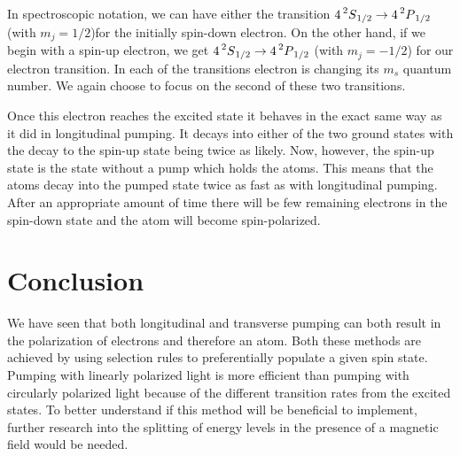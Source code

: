 \documentclass[12pt]{article}
\begin{document}
	In spectroscopic notation, we can have either the transition
	$4\prescript{2}{}S_{1/2} \rightarrow 4\prescript{2}{}P_{1/2}$
	(with $m_j=1/2$)for the initially spin-down electron.
	On the other hand, if we begin with a spin-up electron, we get 
	$4\prescript{2}{}S_{1/2} \rightarrow 4\prescript{2}{}P_{1/2}$
	(with $m_j=-1/2$)
	for our electron transition. In each of the transitions
	electron is changing its $m_s$ quantum number.
	We again choose to focus on the second of these two 
	transitions. 

	Once this electron reaches the excited state it behaves in
	the exact same way as it did in longitudinal pumping. It
	decays into either of the two ground states with the decay
	to the spin-up state being twice as likely. Now, however,
	the spin-up state is the state without a pump which holds 
	the atoms. This means that the atoms decay into the 
	pumped state twice as fast as with longitudinal pumping. 
	After an appropriate amount of time there will be few
	remaining electrons in the spin-down state and the 
	atom will become spin-polarized.

\section{Conclusion}
We have seen that both longitudinal and transverse pumping 
can both result in the polarization of electrons and therefore
an atom. Both these methods are achieved by using selection
rules to preferentially populate a given spin state. Pumping with
linearly polarized light is more efficient than pumping with 
circularly polarized light because of the different transition
rates from the excited states. To better understand if this
method will be beneficial to implement, further research into the
splitting of energy levels in the presence of a magnetic field would
be needed.



\end{document}
